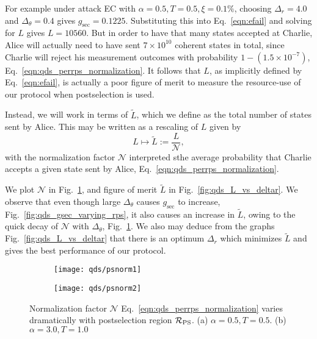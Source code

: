For example under attack EC with $\alpha=0.5, T=0.5, \xi=0.1\%$, choosing $\Delta_r = 4.0 $ and $\Delta_\theta = 0.4 $ gives $g_{\text{sec}} = 0.1225 $. Substituting this into Eq.~\ref{eqn:efail} and solving for $L$ gives $L = 10560$. But in order to have that many states accepted at Charlie, Alice will actually need to have sent $7\times10^{10}$ coherent states in total, since Charlie will reject his measurement outcomes with probability $1 - \left(1.5\times10^{-7}\right)$, Eq.~\ref{eqn:qds_perrps_normalization}. It follows that $L$, as implicitly defined by Eq.~\ref{eqn:efail}, is actually a poor figure of merit to measure the resource-use of our protocol when postselection is used.

Instead, we will work in terms of $\tilde{L}$, which we define as the total number of states sent by Alice. This may be written as a rescaling of $L$ given by
\begin{equation}
L \mapsto \tilde{L} := \frac{L}{\mathcal{N}},
\end{equation}
with the normalization factor $\mathcal{N}$ interpreted sthe average probability that Charlie accepts a given state sent by Alice, Eq.~\ref{eqn:qds_perrps_normalization}.

We plot $\mathcal{N}$ in Fig.~\ref{fig:psnorm}, and figure of merit $\tilde{L}$ in Fig.~\ref{fig:qds_L_vs_deltar}. We observe that even though large $\Delta_\theta$ causes $g_{\text{sec}}$ to increase, Fig.~\ref{fig:qds_gsec_varying_rps}, it also causes an increase in $\tilde{L}$, owing to the quick decay of $\mathcal{N}$ with $\Delta_\theta$, Fig.~\ref{fig:psnorm}. We also may deduce from the graphs Fig.~\ref{fig:qds_L_vs_deltar} that there is an optimum $\Delta_r$ which minimizes $\tilde{L}$ and gives the best performance of our protocol.


\begin{figure}[htp]
\captionsetup{width=0.8\linewidth}
\centering
\begin{subfigure}{0.4\linewidth}
\texttt{[image: qds/psnorm1]}
\caption{}
\end{subfigure}
\begin{subfigure}{0.4\linewidth}
\texttt{[image: qds/psnorm2]}
\caption{}
\end{subfigure}
\caption{\label{fig:psnorm} Normalization factor $\mathcal{N}$ Eq.~\ref{eqn:qds_perrps_normalization} varies dramatically with postselection region $\mathcal{R}_{\text{PS}}$. (a) $\alpha=0.5, T=0.5$. (b) $\alpha=3.0, T=1.0$}
\end{figure}

